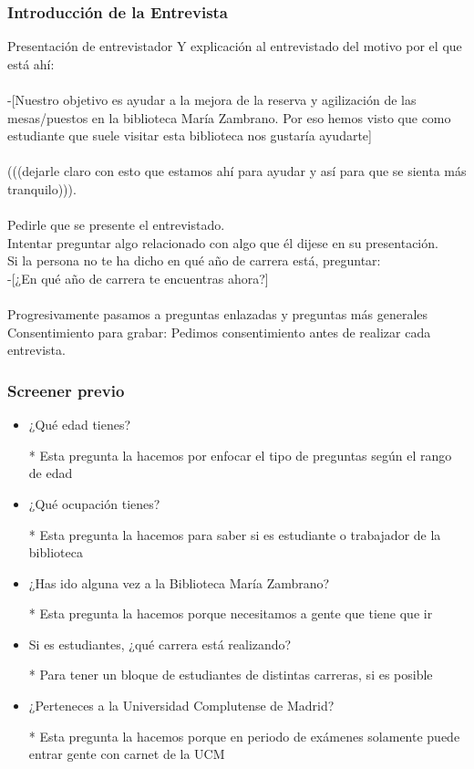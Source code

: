 \documentclass[12pt]{article}
\begin{document}
\subsubsection{Introducción de la Entrevista}

Presentación de entrevistador
Y explicación al entrevistado del motivo por el que está ahí: \\ \\
-[Nuestro objetivo es ayudar a la mejora de la reserva y agilización de las mesas/puestos en la biblioteca María Zambrano. Por eso hemos visto que como estudiante que suele visitar esta biblioteca nos gustaría ayudarte]\\ \\
(((dejarle claro con esto que estamos ahí para ayudar y así para que se sienta más tranquilo))).\\ \\
Pedirle que se presente el entrevistado.\\
Intentar preguntar algo relacionado con algo que él dijese en su presentación.\\
Si la persona no te ha dicho en qué año de carrera está, preguntar:\\
-[¿En qué año de carrera te encuentras ahora?]\\ \\
Progresivamente pasamos a preguntas enlazadas y preguntas más generales\\
Consentimiento para grabar: Pedimos consentimiento antes de realizar cada entrevista.\\

\subsubsection{Screener previo}
\begin{itemize}


\item ¿Qué edad tienes?
\item[*] Esta pregunta la hacemos por enfocar el tipo de preguntas según el rango de edad 
\item ¿Qué ocupación tienes?
\item[*]Esta pregunta la hacemos para saber si es estudiante o trabajador de la biblioteca 
\item ¿Has ido alguna vez a la Biblioteca María Zambrano?
\item[*]Esta pregunta la hacemos porque necesitamos a gente que tiene que ir
\item Si es estudiantes, ¿qué carrera está realizando?
\item[*]Para tener un bloque de estudiantes de distintas carreras, si es posible
\item ¿Perteneces a la Universidad Complutense de Madrid?
\item[*]Esta pregunta la hacemos porque en periodo de exámenes solamente puede entrar gente con carnet de la UCM

\end{itemize}
\end{document}
